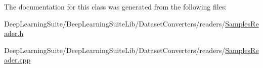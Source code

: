 The documentation for this class was generated from the following files\+:\begin{DoxyCompactItemize}
\item 
Deep\+Learning\+Suite/\+Deep\+Learning\+Suite\+Lib/\+Dataset\+Converters/readers/\hyperlink{_samples_reader_8h}{Samples\+Reader.\+h}\item 
Deep\+Learning\+Suite/\+Deep\+Learning\+Suite\+Lib/\+Dataset\+Converters/readers/\hyperlink{_samples_reader_8cpp}{Samples\+Reader.\+cpp}\end{DoxyCompactItemize}
